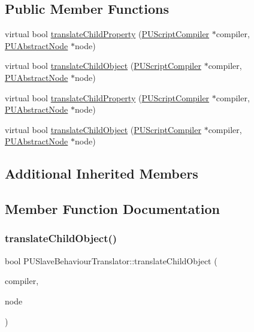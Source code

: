 \subsection*{Public Member Functions}
\begin{DoxyCompactItemize}
\item 
virtual bool \hyperlink{classPUSlaveBehaviourTranslator_aad5bf398d3a89d8695ba3368a78c9aa3}{translate\+Child\+Property} (\hyperlink{classPUScriptCompiler}{P\+U\+Script\+Compiler} $\ast$compiler, \hyperlink{classPUAbstractNode}{P\+U\+Abstract\+Node} $\ast$node)
\item 
virtual bool \hyperlink{classPUSlaveBehaviourTranslator_a159a9a0424b004bc32a5e3e69ba8a0d5}{translate\+Child\+Object} (\hyperlink{classPUScriptCompiler}{P\+U\+Script\+Compiler} $\ast$compiler, \hyperlink{classPUAbstractNode}{P\+U\+Abstract\+Node} $\ast$node)
\item 
virtual bool \hyperlink{classPUSlaveBehaviourTranslator_a93db28f5b7a89dbed470f0ac6cdce82b}{translate\+Child\+Property} (\hyperlink{classPUScriptCompiler}{P\+U\+Script\+Compiler} $\ast$compiler, \hyperlink{classPUAbstractNode}{P\+U\+Abstract\+Node} $\ast$node)
\item 
virtual bool \hyperlink{classPUSlaveBehaviourTranslator_ac7ba1a952d262033c1d10d770eec9fd4}{translate\+Child\+Object} (\hyperlink{classPUScriptCompiler}{P\+U\+Script\+Compiler} $\ast$compiler, \hyperlink{classPUAbstractNode}{P\+U\+Abstract\+Node} $\ast$node)
\end{DoxyCompactItemize}
\subsection*{Additional Inherited Members}


\subsection{Member Function Documentation}
\mbox{\label{classPUSlaveBehaviourTranslator_a159a9a0424b004bc32a5e3e69ba8a0d5}} 
\subsubsection{\texorpdfstring{translate\+Child\+Object()}{translateChildObject()}\hspace{0.1cm}{\footnotesize\ttfamily [1/2]}}
{\footnotesize\ttfamily bool P\+U\+Slave\+Behaviour\+Translator\+::translate\+Child\+Object (\begin{DoxyParamCaption}\item[{\hyperlink{classPUScriptCompiler}{P\+U\+Script\+Compiler} $\ast$}]{compiler,  }\item[{\hyperlink{classPUAbstractNode}{P\+U\+Abstract\+Node} $\ast$}]{node }\end{DoxyParamCaption})\hspace{0.3cm}{\ttfamily [virtual]}}

